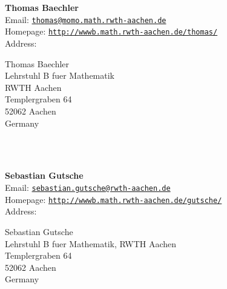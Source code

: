 \documentclass[a4paper,11pt]{report}
\newcommand{\logpage}[1]{\protect\write\pagenrlog{#1, \thepage,}}
\begin{document}
\begin{titlepage}
\mbox{}\\
{\mbox{}\\
\small \noindent \textbf{ Thomas Baechler\\
    }  Email: \href{mailto://thomas@momo.math.rwth-aachen.de} {\texttt{thomas@momo.math.rwth-aachen.de}}\\
  Homepage: \href{http://wwwb.math.rwth-aachen.de/~thomas/} {\texttt{http://wwwb.math.rwth-aachen.de/\texttt{}thomas/}}\\
  Address: \begin{minipage}[t]{8cm}\noindent
 Thomas Baechler\\
 Lehrstuhl B fuer Mathematik\\
 RWTH Aachen\\
 Templergraben 64\\
 52062 Aachen\\
 Germany\\
 \end{minipage}
}\\
{\mbox{}\\
\small \noindent \textbf{ Sebastian Gutsche\\
    }  Email: \href{mailto://sebastian.gutsche@rwth-aachen.de} {\texttt{sebastian.gutsche@rwth-aachen.de}}\\
  Homepage: \href{http://wwwb.math.rwth-aachen.de/~gutsche/} {\texttt{http://wwwb.math.rwth-aachen.de/\texttt{}gutsche/}}\\
  Address: \begin{minipage}[t]{8cm}\noindent
 Sebastian Gutsche\\
 Lehrstuhl B fuer Mathematik, RWTH Aachen\\
 Templergraben 64\\
 52062 Aachen\\
 Germany\\
 \end{minipage}
}\\
\end{titlepage}

\newpage\setcounter{page}{2}
\newpage

\def\contentsname{Contents\logpage{[ 0, 0, 1 ]}}

\tableofcontents
\newpage

\end{document}

